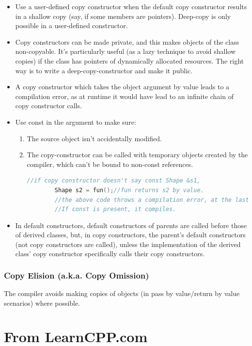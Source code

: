 \documentclass{report}
\begin{document}
\begin{itemize}
\item Use a user-defined copy constructor when the default copy constructor results in a shallow copy (say, if some members are pointers). Deep-copy is only possible in a user-defined constructor.
\item Copy constructors can be made private, and this makes objects of the class non-copyable. It's particularly useful (as a lazy technique to avoid shallow copies) if the class has pointers of dynamically allocated resources. The right way is to write a deep-copy-constructor and make it public.
\item A copy constructor which takes the object argument by value leads to a compilation error, as at runtime it would have lead to an infinite chain of copy constructor calls.
\item Use const in the argument to make sure:
\begin{enumerate}
    \item The source object isn't accidentally modified.
    \item The copy-constructor can be called with temporary objects created by the compiler, which can't be bound to non-const references.
    \begin{lstlisting}[language=C++]
        //if copy constructor doesn't say const Shape &s1,
        Shape s2 = fun();//fun returns s2 by value.
        //the above code throws a compilation error, at the last line.
        //If const is present, it compiles.
    \end{lstlisting}
\end{enumerate} 
\item In default constructors, default constructors of parents are called before those of derived classes, but, in copy constructors, the parent's default constructors (not copy constructors are called), unless the implementation of the derived class' copy constructor specifically calls their copy constructors.
\end{itemize}
\subsubsection{Copy Elision (a.k.a. Copy Omission)} 
The compiler avoids making copies of objects (in pass by value/return by value scenarios) where possible.

\section{From LearnCPP.com}
\end{document}
